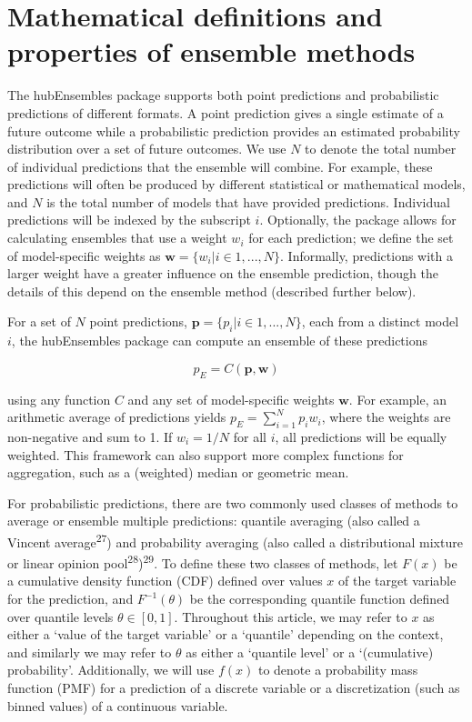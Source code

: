 \documentclass[
  letterpaper,
  DIV=11,
  numbers=noendperiod]{scrartcl}
\begin{document}
\section{Mathematical definitions and properties of ensemble
methods}\label{sec-defs}

The {hubEnsembles} package supports both point predictions and
probabilistic predictions of different formats. A point prediction gives
a single estimate of a future outcome while a probabilistic prediction
provides an estimated probability distribution over a set of future
outcomes. We use \(N\) to denote the total number of individual
predictions that the ensemble will combine. For example, these
predictions will often be produced by different statistical or
mathematical models, and \(N\) is the total number of models that have
provided predictions. Individual predictions will be indexed by the
subscript \(i\). Optionally, the package allows for calculating
ensembles that use a weight \(w_i\) for each prediction; we define the
set of model-specific weights as
\(\pmb{w} = \{w_i | i \in 1, ..., N\}\). Informally, predictions with a
larger weight have a greater influence on the ensemble prediction,
though the details of this depend on the ensemble method (described
further below).

For a set of \(N\) point predictions,
\(\pmb{p} = \{p_i|i \in 1, ..., N\}\), each from a distinct model \(i\),
the {hubEnsembles} package can compute an ensemble of these predictions

\[
p_E = C(\pmb{p}, \pmb{w}) 
\]

using any function \(C\) and any set of model-specific weights
\(\pmb{w}\). For example, an arithmetic average of predictions yields
\(p_E = \sum_{i=1}^Np_iw_i\), where the weights are non-negative and sum
to 1. If \(w_i = 1/N\) for all \(i\), all predictions will be equally
weighted. This framework can also support more complex functions for
aggregation, such as a (weighted) median or geometric mean.

For probabilistic predictions, there are two commonly used classes of
methods to average or ensemble multiple predictions: quantile averaging
(also called a Vincent average\textsuperscript{27}) and probability
averaging (also called a distributional mixture or linear opinion
pool\textsuperscript{28})\textsuperscript{29}. To define these two
classes of methods, let \(F(x)\) be a cumulative density function (CDF)
defined over values \(x\) of the target variable for the prediction, and
\(F^{-1}(\theta)\) be the corresponding quantile function defined over
quantile levels \(\theta \in [0, 1]\). Throughout this article, we may
refer to \(x\) as either a `value of the target variable' or a
`quantile' depending on the context, and similarly we may refer to
\(\theta\) as either a `quantile level' or a `(cumulative) probability'.
Additionally, we will use \(f(x)\) to denote a probability mass function
(PMF) for a prediction of a discrete variable or a discretization (such
as binned values) of a continuous variable.
\end{document}
